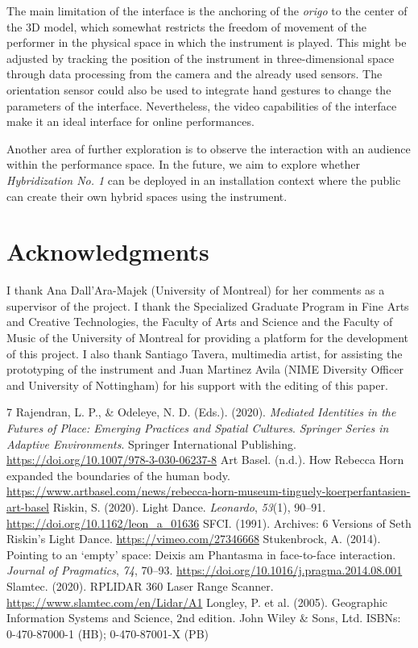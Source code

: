 \documentclass[sigconf]{nimeart}
\begin{document}
The main limitation of the interface is the anchoring of the \emph{origo} to the center of the 3D model, which somewhat restricts the freedom of movement of the performer in the physical space in which the instrument is played. This might be adjusted by tracking the position of the instrument in three-dimensional space through data processing from the camera and the already used sensors. The orientation sensor could also be used to integrate hand gestures to change the parameters of the interface. Nevertheless, the video capabilities of the interface make it an ideal interface for online performances.

Another area of further exploration is to observe the interaction with an audience within the performance space. In the future, we aim to explore whether \emph{Hybridization No. 1} can be deployed in an installation context where the public can create their own hybrid spaces using the instrument.

\section{Acknowledgments}\label{acknowledgments}

I thank Ana Dall'Ara-Majek (University of Montreal) for her comments as a supervisor of the project. I thank the Specialized Graduate Program in Fine Arts and Creative Technologies, the Faculty of Arts and Science and the Faculty of Music of the University of Montreal for providing a platform for the development of this project. I also thank Santiago Tavera, multimedia artist, for assisting the prototyping of the instrument and Juan Martinez Avila (NIME Diversity Officer and University of Nottingham) for his support with the editing of this paper.

\begin{thebibliography}{7}
 {{ }}  Rajendran, L. P., \& Odeleye, N. D. (Eds.). (2020). \emph{Mediated Identities in the Futures of Place: Emerging Practices and Spatial Cultures}. \emph{Springer Series in Adaptive Environments}. Springer International Publishing. \url{https://doi.org/10.1007/978-3-030-06237-8}{}
 Art Basel. (n.d.). How Rebecca Horn expanded the boundaries of the human body. \url{https://www.artbasel.com/news/rebecca-horn-museum-tinguely-koerperfantasien-art-basel}
 {{ }}  Riskin, S. (2020). Light Dance. \emph{Leonardo}, \emph{53}(1), 90--91. \url{https://doi.org/10.1162/leon_a_01636}{}
 SFCI. (1991). Archives: 6 Versions of Seth Riskin's Light Dance. \url{https://vimeo.com/27346668}
 {{ }}  Stukenbrock, A. (2014). Pointing to an `empty' space: Deixis am Phantasma in face-to-face interaction. \emph{Journal of Pragmatics}, \emph{74}, 70--93. \url{https://doi.org/10.1016/j.pragma.2014.08.001}{}
 Slamtec. (2020). RPLIDAR 360 Laser Range Scanner. \url{https://www.slamtec.com/en/Lidar/A1}
 Longley, P. et al. (2005). Geographic Information Systems and Science, 2nd edition. John Wiley \& Sons, Ltd. ISBNs: 0-470-87000-1 (HB); 0-470-87001-X (PB)
\end{thebibliography}
\end{document}
